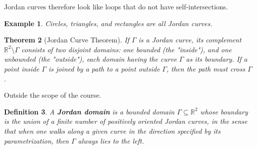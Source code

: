 \documentclass[10pt]{article}
\makeatletter
\newcommand{\R}{\mathbb{R}}
\theoremstyle{newstyle}
\newtheorem{thm}{Theorem}[section]
\newtheorem{defn}[thm]{Definition}
\newtheorem{exmp}[thm]{Example}
\newenvironment{pf}[1][\proofname]{\par
  \pushQED{\qed}%
  \normalfont \topsep0\p@\relax
  \trivlist
  \item[\hskip\labelsep\scshape
  #1\@addpunct{.}]\ignorespaces
}{%
  \popQED\endtrivlist\@endpefalse
}
\makeatother
\begin{document}
Jordan curves therefore look like loops that do not have self-intersections. 

\begin{exmp}
Circles, triangles, and rectangles are all Jordan curves.
\end{exmp}

\begin{thm}[Jordan Curve Theorem]
If $\Gamma$ is a Jordan curve, its complement $\R^2 \setminus \Gamma$ consists of two disjoint 
domains: one bounded (the "inside"), and one unbounded (the "outside"), each 
domain having the curve $\Gamma$ as its boundary. If a point inside $\Gamma$ is joined 
by a path to a point outside $\Gamma$, then the path must cross $\Gamma$.
\end{thm}
\begin{pf}
Outside the scope of the course.
\end{pf}

\begin{defn}
A {\bf Jordan domain} is a bounded domain $\Gamma \subseteq \R^2$ whose boundary is the union of 
a finite number of {\it positively oriented} Jordan curves, in the sense that when one walks 
along a given curve in the direction specified by its parametrization, then $\Gamma$ always 
lies to the left.
\end{defn}
\end{document}
